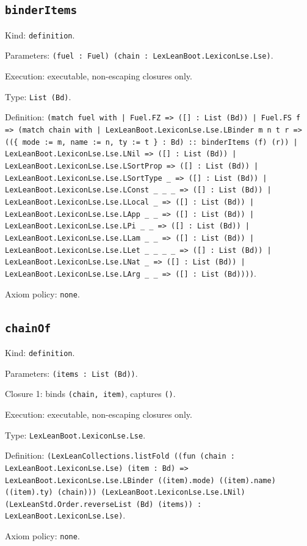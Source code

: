 \documentclass[11pt]{article}
\begin{document}
\subsection*{\texttt{binderItems}}
\noindent Kind: \texttt{definition}.\par
\noindent Parameters: \texttt{(fuel : Fuel) (chain : LexLeanBoot.LexiconLse.Lse)}.\par
\noindent Execution: executable, non-escaping closures only.\par
\noindent Type: \texttt{List (Bd)}.\par
\noindent Definition: \texttt{(match fuel with | Fuel.FZ => ([] : List (Bd)) | Fuel.FS f => (match chain with | LexLeanBoot.LexiconLse.Lse.LBinder m n t r => ((\{ mode := m, name := n, ty := t \} : Bd) :: binderItems (f) (r)) | LexLeanBoot.LexiconLse.Lse.LNil => ([] : List (Bd)) | LexLeanBoot.LexiconLse.Lse.LSortProp => ([] : List (Bd)) | LexLeanBoot.LexiconLse.Lse.LSortType \_ => ([] : List (Bd)) | LexLeanBoot.LexiconLse.Lse.LConst \_ \_ \_ => ([] : List (Bd)) | LexLeanBoot.LexiconLse.Lse.LLocal \_ => ([] : List (Bd)) | LexLeanBoot.LexiconLse.Lse.LApp \_ \_ => ([] : List (Bd)) | LexLeanBoot.LexiconLse.Lse.LPi \_ \_ => ([] : List (Bd)) | LexLeanBoot.LexiconLse.Lse.LLam \_ \_ => ([] : List (Bd)) | LexLeanBoot.LexiconLse.Lse.LLet \_ \_ \_ \_ => ([] : List (Bd)) | LexLeanBoot.LexiconLse.Lse.LNat \_ => ([] : List (Bd)) | LexLeanBoot.LexiconLse.Lse.LArg \_ \_ => ([] : List (Bd))))}.\par
\noindent Axiom policy: \texttt{none}.\par
\subsection*{\texttt{chainOf}}
\noindent Kind: \texttt{definition}.\par
\noindent Parameters: \texttt{(items : List (Bd))}.\par
\noindent Closure 1: binds \texttt{(chain, item)}, captures \texttt{()}.\par
\noindent Execution: executable, non-escaping closures only.\par
\noindent Type: \texttt{LexLeanBoot.LexiconLse.Lse}.\par
\noindent Definition: \texttt{(LexLeanCollections.listFold ((fun (chain : LexLeanBoot.LexiconLse.Lse) (item : Bd) => LexLeanBoot.LexiconLse.Lse.LBinder ((item).mode) ((item).name) ((item).ty) (chain))) (LexLeanBoot.LexiconLse.Lse.LNil) (LexLeanStd.Order.reverseList (Bd) (items)) : LexLeanBoot.LexiconLse.Lse)}.\par
\noindent Axiom policy: \texttt{none}.\par
\end{document}
